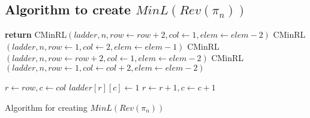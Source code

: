 \subsection{Algorithm to create $MinL(Rev(\pi_{n}))$}
\begin{algorithm}
    \begin{algorithmic}[1]
                \State \small{\textbf{return}}
            \EndIf
                \State \small{{\sc CMinRL}$(ladder, n, row \gets row+2, col \gets 1, elem \gets elem-2)$}
                \State \small{{\sc CMinRL}$(ladder, n, row \gets 1, col \gets 2, elem \gets elem-1)$}
            \Else 
                    \State \small{{\sc CMinRL}$(ladder, n, row \gets row+2, col \gets 1, elem \gets elem-2)$}
                \Else 
                    \State \small{{\sc CMinRL}$(ladder, n, row \gets 1, col \gets col+2, elem \gets elem-2)$}
                \EndIf
            \EndIf

        \State \small{$r \gets row, c \gets col$}
            \State \small{$ladder[r][c] \gets 1$}
            \State \small{$r \gets r+1,c \gets c+1$}
        \EndFor
        \EndFunction
    \end{algorithmic}
    \caption{Algorithm for creating $MinL(Rev(\pi_{n}))$}
    \label{Alg:MinRevLadder}
\end{algorithm}

